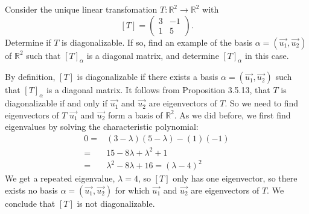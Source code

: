 \documentclass[12pt]{article}
\newenvironment{problem}[2][Problem]
{
	\begin{trivlist} 
		\item[\hskip \labelsep {\bfseries #1 #2:}]
	}
{
	\end{trivlist}
	}
\newenvironment{solution}[1][Solution]
{
	\begin{trivlist} 
		\item[\hskip \labelsep {\itshape #1:}]
	}
	{
	\end{trivlist}
}
\begin{document}
\newpage
\begin{problem}{6}
Consider the unique linear transfomation $T: \mathbb{R}^2 \to \mathbb{R}^2$ with
\[
[T] = \begin{pmatrix} 3&-1\\1&5\end{pmatrix} \text{.}
\]
Determine if $T$ is diagonalizable. If so, find an example of the basis $\alpha = (\vec{u_{1}}, \vec{u_{2}})$ of $\mathbb{R}^2$ such that $[T]_{\alpha}$ is a diagonal matrix, and determine $[T]_{\alpha}$ in this case.
\noindent
\newline
\newline
\begin{solution}
By definition, $[T]$ is diagonalizable if there exists a basis $\alpha = (\vec{u_{1}},\vec{u_{2}})$ such that $[T]_{\alpha}$ is a diagonal matrix. It follows from Proposition 3.5.13, that $T$ is diagonalizable if and only if $\vec{u_{1}}$ and $\vec{u_{2}}$ are eigenvectors of $T$. So we need to find eigenvectors of $T$ $\vec{u_{1}}$ and $\vec{u_{2}}$ form a basis of $\mathbb{R}^2$. As we did before, we first find eigenvalues by solving the characteristic polynomial:
\begin{align*}
0=&(3-\lambda)(5-\lambda)-(1)(-1)\\
=&15-8\lambda +\lambda ^2 +1\\
=&\lambda ^2 -8\lambda +16 =(\lambda - 4)^2
\end{align*}
We get a repeated eigenvalue, $\lambda=4$, so $[T]$ only has one eigenvector, so there exists no basis $\alpha=(\vec{u_{1}},\vec{u_{2}})$ for which $\vec{u_{1}}$ and $\vec{u_{2}}$ are eigenvectors of $T$. We conclude that $[T]$ is not diagonalizable.
\end{solution}
\end{problem}
\end{document}
